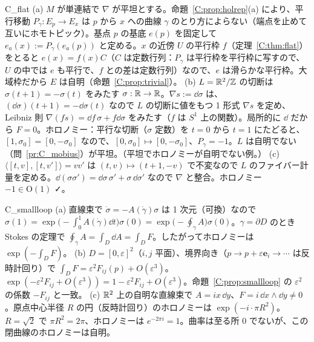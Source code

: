 \begin{soll}{C_flat}
(a) $M$ が単連結で $\nabla$ が平坦とする。命題~\ref{C:prop:holrep}(a) により、平行移動 $P_\gamma:E_p\to E_x$ は $p$ から $x$ への曲線 $\gamma$ のとり方によらない（端点を止めて互いにホモトピック）。基点 $p$ の基底 $e(p)$ を固定して $e_a(x):=P_\gamma(e_a(p))$ と定める。$x$ の近傍 $U$ の平行枠 $f$（定理~\ref{C:thm:flat}）をとると $e(x)=f(x)C$（$C$ は定数行列：$P_\gamma$ は平行枠を平行枠に写すので、$U$ の中では $e$ も平行で、$f$ との差は定数行列）なので、$e$ は滑らかな平行枠。大域枠だから $E$ は自明（命題~\ref{C:prop:trivial}）。
(b) $L=\mathbb R^2/\mathbb Z$ の切断は $\sigma(t+1)=-\sigma(t)$ をみたす $\sigma:\mathbb R\to\mathbb R$。$\nabla s:=\dd\sigma$ は、$(\dd\sigma)(t+1)=-\dd\sigma(t)$ なので $L$ の切断に値をもつ 1 形式 $\nabla s$ を定め、Leibniz 則 $\nabla(fs)=\dd f\,\sigma+f\dd\sigma$ をみたす（$f$ は $S^1$ 上の関数）。局所的に $\dd$ だから $F=0$。ホロノミー：平行な切断（$\sigma$ 定数）を $t=0$ から $t=1$ にたどると、$[1,\sigma_0]=[0,-\sigma_0]$ なので、$[0,\sigma_0]\mapsto[0,-\sigma_0]$、$P_\gamma=-1$。$L$ は自明でない（問~\ref{pr:C_mobius}）が平坦。（平坦でホロノミーが自明でない例。）
(c) $\langle[t,v],[t,v']\rangle=vv'$ は $(t,v)\mapsto(t+1,-v)$ で不変なので $L$ のファイバー計量を定める。$\dd(\sigma\sigma')=\dd\sigma\,\sigma'+\sigma\,\dd\sigma'$ なので $\nabla$ と整合。ホロノミー $-1\in\mathrm O(1)$ ✓。
\end{soll}

\begin{soll}{C_smallloop}
(a) 直線束で $\dot\sigma=-A(\dot\gamma)\sigma$ は 1 次元（可換）なので $\sigma(1)=\exp\bigl(-\int_0^1A(\dot\gamma)\dd t\bigr)\sigma(0)=\exp\bigl(-\oint_\gamma A\bigr)\sigma(0)$。$\gamma=\partial D$ のとき Stokes の定理で $\oint_\gamma A=\int_D\dd A=\int_DF$。したがってホロノミーは $\exp(-\int_DF)$。
(b) $D=[0,\varepsilon]^2$（$i,j$ 平面）、境界向き（$p\to p+\varepsilon\mathbf e_i\to\cdots$ は反時計回り）で $\int_DF=\varepsilon^2F_{ij}(p)+O(\varepsilon^3)$。$\exp(-\varepsilon^2F_{ij}+O(\varepsilon^3))=1-\varepsilon^2F_{ij}+O(\varepsilon^3)$。命題~\ref{C:prop:smallloop} の $\varepsilon^2$ の係数 $-F_{ij}$ と一致。
(c) $\mathbb R^2$ 上の自明な直線束で $A=ix\,\dd y$、$F=i\,\dd x\wedge\dd y\ne0$。原点中心半径 $R$ の円（反時計回り）のホロノミーは $\exp(-i\cdot\pi R^2)$。$R=\sqrt2$ で $\pi R^2=2\pi$、ホロノミーは $e^{-2\pi i}=1$。曲率は至る所 $0$ でないが、この閉曲線のホロノミーは自明。
\end{soll}

